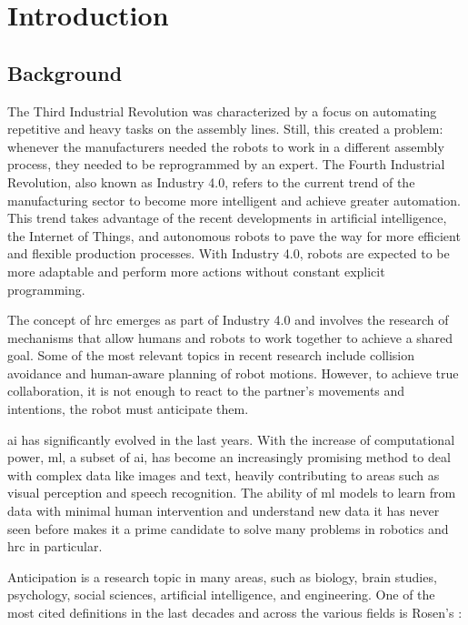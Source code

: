 \chapter{Introduction}
\label{chapter:introduction}

\section{Background}

The Third Industrial Revolution was characterized by a focus on automating repetitive and heavy tasks on the assembly lines. Still, this created a problem: whenever the manufacturers needed the robots to work in a different assembly process, they needed to be reprogrammed by an expert. The Fourth Industrial Revolution, also known as Industry 4.0, refers to the current trend of the manufacturing sector to become more intelligent and achieve greater automation. This trend takes advantage of the recent developments in artificial intelligence, the Internet of Things, and autonomous robots to pave the way for more efficient and flexible production processes. With Industry 4.0, robots are expected to be more adaptable and perform more actions without constant explicit programming.

The concept of \acf{hrc} emerges as part of Industry 4.0 and involves the research of mechanisms that allow humans and robots to work together to achieve a shared goal. Some of the most relevant topics in recent research include collision avoidance and human-aware planning of robot motions. However, to achieve true collaboration, it is not enough to react to the partner’s movements and intentions, the robot must anticipate them.

\acf{ai} has significantly evolved in the last years. With the increase of computational power, \acf{ml}, a subset of \acs{ai}, has become an increasingly promising method to deal with complex data like images and text, heavily contributing to areas such as visual perception and speech recognition. The ability of \acs{ml} models to learn from data with minimal human intervention and understand new data it has never seen before makes it a prime candidate to solve many problems in robotics and \acs{hrc} in particular.

Anticipation is a research topic in many areas, such as biology, brain studies, psychology, social sciences, artificial intelligence, and engineering. One of the most cited definitions in the last decades and across the various fields is Rosen's \cite{Rosen1985}:

